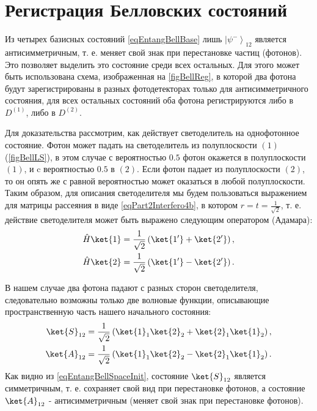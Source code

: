 \section{Регистрация Белловских состояний}
\label{pPart3EntangleBellReg}
Из четырех базисных состояний \eqref{eqEntangBellBase} лишь 
$\left|\psi^{-}\right>_{12}$ является антисимметричным, т. е. меняет
свой знак при перестановке частиц (фотонов). Это позволяет выделить
это состояние среди всех остальных. Для этого может быть использована
схема, изображенная на \autoref{figBellReg}, в которой два фотона
будут зарегистрированы в разных фотодетекторах только для
антисимметричного состояния, для всех остальных состояний оба фотона
регистрируются либо в $D^{(1)}$, либо в $D^{(2)}$.


 
Для доказательства рассмотрим, как действует светоделитель на однофотонное
состояние. Фотон может падать на светоделитель из полуплоскости
$\left(1\right)$ (\autoref{figBellLS}), в этом случае с вероятностью
$0.5$ фотон окажется в полуплоскости $\left(1\right)$, и c вероятностью
$0.5$ в $\left(2\right)$. Если фотон падает из полуплоскости
$\left(2\right)$, то он опять же с равной вероятностью может оказаться
в любой полуплоскости. 
Таким образом, для описания светоделителя мы будем пользоваться выражением
для матрицы рассеяния в виде \eqref{eqPart2Interfero4b}, в котором
$r=t=\frac{1}{\sqrt{2}}$, т. е. действие светоделителя может быть
выражено следующим оператором 
(Адамара\cite{bPhisQuantInfo}):
\begin{eqnarray}
\hat{H} \ket{1} = \frac{1}{\sqrt{2}}
\left(\ket{1'} +
\ket{2'}\right),
\nonumber \\
\hat{H} \ket{2} = \frac{1}{\sqrt{2}}\left(\ket{1'} -
\ket{2'}\right).
\label{eqEntangBellHadamar}
\end{eqnarray}

В нашем случае два фотона падают с разных сторон светоделителя,
следовательно возможны только две волновые функции, описывающие
пространственную часть нашего начального состояния:
\begin{eqnarray}
\ket{S}_{12} = \frac{1}{\sqrt{2}}\left(
\ket{1}_1\ket{2}_2 +
\ket{2}_1\ket{1}_2\right),
\nonumber \\
\ket{A}_{12} = \frac{1}{\sqrt{2}}\left(
\ket{1}_1\ket{2}_2 -
\ket{2}_1\ket{1}_2\right).
\label{eqEntangBellSpaceInit}
\end{eqnarray}
Как видно из \eqref{eqEntangBellSpaceInit}, состояние $\ket{S}_{12}$
является симметричным, т. е. сохраняет свой вид при перестановке
фотонов, а состояние $\ket{A}_{12}$ - антисимметричным (меняет свой
знак при перестановке фотонов).

